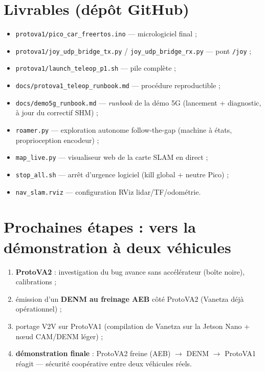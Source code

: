 \documentclass[11pt,a4paper]{article}
\begin{document}
\section{Livrables (dépôt GitHub)}
\begin{itemize}[itemsep=2pt]
  \item \texttt{protova1/pico\_car\_freertos.ino} --- micrologiciel final ;
  \item \texttt{protova1/joy\_udp\_bridge\_tx.py} /
        \texttt{joy\_udp\_bridge\_rx.py} --- pont \texttt{/joy} ;
  \item \texttt{protova1/launch\_teleop\_p1.sh} --- pile complète ;
  \item \texttt{docs/protova1\_teleop\_runbook.md} --- procédure reproductible ;
  \item \texttt{docs/demo5g\_runbook.md} --- \emph{runbook} de la démo 5G
        (lancement + diagnostic, à jour du correctif SHM) ;
  \item \texttt{roamer.py} --- exploration autonome follow-the-gap
        (machine à états, proprioception encodeur) ;
  \item \texttt{map\_live.py} --- visualiseur web de la carte SLAM en direct ;
  \item \texttt{stop\_all.sh} --- arrêt d'urgence logiciel (kill global +
        neutre Pico) ;
  \item \texttt{nav\_slam.rviz} --- configuration RViz lidar/TF/odométrie.
\end{itemize}

\section{Prochaines étapes : vers la démonstration à deux véhicules}
\begin{enumerate}[itemsep=2pt]
  \item \textbf{ProtoVA2} : investigation du bug \og avance sans accélérateur \fg{}
        (boîte noire), calibrations ;
  \item émission d'un \textbf{DENM au freinage AEB} côté ProtoVA2 (Vanetza déjà
        opérationnel) ;
  \item portage V2V sur ProtoVA1 (compilation de Vanetza sur la Jetson Nano +
        n\oe ud CAM/DENM léger) ;
  \item \textbf{démonstration finale} : ProtoVA2 freine (AEB) $\rightarrow$ DENM
        $\rightarrow$ ProtoVA1 réagit --- sécurité coopérative entre deux
        véhicules réels.
\end{enumerate}
\end{document}
